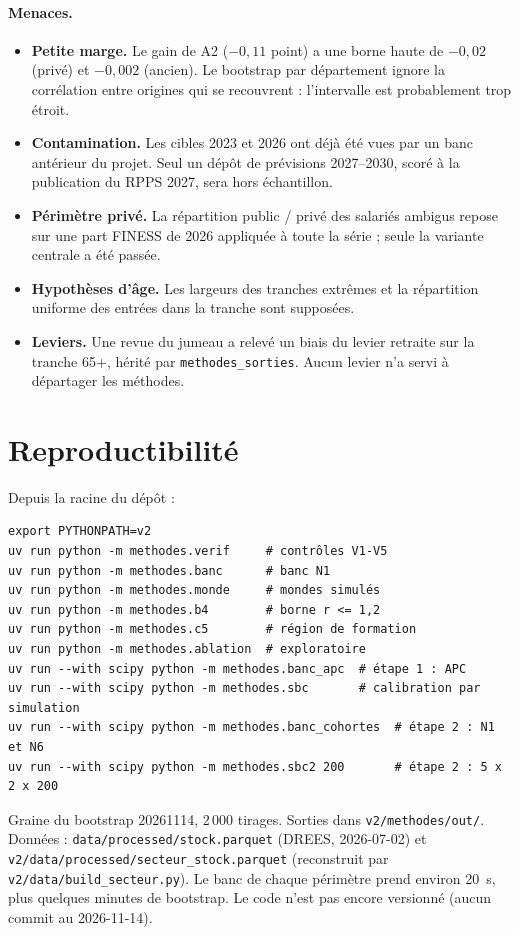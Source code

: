 \paragraph{Menaces.}
\begin{itemize}
  \item \textbf{Petite marge.} Le gain de A2 ($-0{,}11$ point) a une borne haute de $-0{,}02$ (privé)
        et $-0{,}002$ (ancien). Le bootstrap par département ignore la corrélation entre origines qui
        se recouvrent : l'intervalle est probablement trop étroit\suppose.
  \item \textbf{Contamination.} Les cibles 2023 et 2026 ont déjà été vues par un banc antérieur du
        projet. Seul un dépôt de prévisions 2027--2030, scoré à la publication du RPPS 2027, sera hors
        échantillon.
  \item \textbf{Périmètre privé.} La répartition public / privé des salariés ambigus repose sur une
        part FINESS de 2026 appliquée à toute la série ; seule la variante centrale a été passée.
  \item \textbf{Hypothèses d'âge.} Les largeurs des tranches extrêmes et la répartition uniforme des
        entrées dans la tranche sont supposées.
  \item \textbf{Leviers.} Une revue du jumeau a relevé un biais du levier retraite sur la tranche 65+,
        hérité par \texttt{methodes\_sorties}. Aucun levier n'a servi à départager les méthodes.
\end{itemize}

\section{Reproductibilité}
Depuis la racine du dépôt :
\begin{verbatim}
export PYTHONPATH=v2
uv run python -m methodes.verif     # contrôles V1-V5
uv run python -m methodes.banc      # banc N1
uv run python -m methodes.monde     # mondes simulés
uv run python -m methodes.b4        # borne r <= 1,2
uv run python -m methodes.c5        # région de formation
uv run python -m methodes.ablation  # exploratoire
uv run --with scipy python -m methodes.banc_apc  # étape 1 : APC
uv run --with scipy python -m methodes.sbc       # calibration par simulation
uv run --with scipy python -m methodes.banc_cohortes  # étape 2 : N1 et N6
uv run --with scipy python -m methodes.sbc2 200       # étape 2 : 5 x 2 x 200
\end{verbatim}
Graine du bootstrap 20261114, 2\,000 tirages. Sorties dans \texttt{v2/methodes/out/}. Données :
\texttt{data/processed/stock.parquet} (DREES, 2026-07-02) et
\texttt{v2/data/processed/secteur\_stock.parquet} (reconstruit par \texttt{v2/data/build\_secteur.py}).
Le banc de chaque périmètre prend environ 20\mesure{}~s, plus quelques minutes de bootstrap. Le code
n'est pas encore versionné (aucun commit au 2026-11-14).

